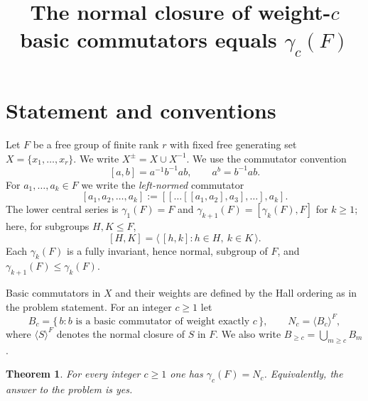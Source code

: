 \documentclass{amsart}
\newtheorem{theorem}{Theorem}
\theoremstyle{definition}
\theoremstyle{remark}
\begin{document}
\title{The normal closure of weight-$c$ basic commutators equals $\gamma_c(F)$}
\maketitle

\section{Statement and conventions}

Let $F$ be a free group of finite rank $r$ with fixed free generating set
$X=\{x_1,\dots,x_r\}$. We write $X^{\pm}=X\cup X^{-1}$. We use the commutator
convention
\[
[a,b]=a^{-1}b^{-1}ab ,\qquad a^{b}=b^{-1}ab .
\]
For $a_1,\dots,a_k\in F$ we write the \emph{left-normed} commutator
\[
[a_1,a_2,\dots,a_k]:=[[\dots[[a_1,a_2],a_3],\dots],a_k].
\]
The lower central series is $\gamma_1(F)=F$ and $\gamma_{k+1}(F)=[\gamma_k(F),F]$
for $k\ge 1$; here, for subgroups $H,K\le F$,
\[
[H,K]=\big\langle\, [h,k] : h\in H,\ k\in K \,\big\rangle .
\]
Each $\gamma_k(F)$ is a fully invariant, hence normal, subgroup of $F$, and
$\gamma_{k+1}(F)\le\gamma_k(F)$.

Basic commutators in $X$ and their weights are defined by the Hall ordering as in
the problem statement. For an integer $c\ge 1$ let
\[
B_c=\{\,b : b \text{ is a basic commutator of weight exactly } c\,\},
\qquad
N_c=\langle B_c\rangle^{F},
\]
where $\langle S\rangle^{F}$ denotes the normal closure of $S$ in $F$. We also
write $B_{\ge c}=\bigcup_{m\ge c}B_m$.

\begin{theorem}\label{thm:main}
For every integer $c\ge 1$ one has $\gamma_c(F)=N_c$. Equivalently, the answer to
the problem is \emph{yes}.
\end{theorem}
\end{document}
